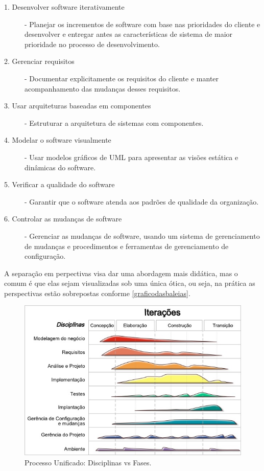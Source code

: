 \documentclass[
	article,			%
	11pt,				%
	oneside,			%
	a4paper,			%
	english,			%
	brazil,				%
	sumario=tradicional
	]{abntex2}
\begin{document}
\begin{description}
   \item[1. Desenvolver software iterativamente] - Planejar os incrementos de
   software com base nas prioridades do cliente e desenvolver e entregar antes
   as características de sistema de maior prioridade no processo de
   desenvolvimento.
   \item[2. Gerenciar requisitos] - Documentar explicitamente os requisitos do
   cliente e manter acompanhamento das mudanças desses requisitos.
   \item[3. Usar arquiteturas baseadas em componentes] - Estruturar a
   arquitetura de sistemas com componentes.
   \item[4. Modelar o software visualmente] - Usar modelos gráficos de UML para
   apresentar as visões estática e dinâmicas do software.
   \item[5. Verificar a qualidade do software] - Garantir que o software atenda
   aos padrões de qualidade da organização.
   \item[6. Controlar as mudanças de software] - Gerenciar as mudanças de
   software, usando um sistema de gerenciamento de mudanças e procedimentos e
   ferramentas de gerenciamento de configuração.
\end{description}

A separação em perpectivas visa dar uma abordagem mais didática, mas o comum é
que elas sejam visualizadas sob uma única ótica, ou seja, na prática as
perspectivas estão sobrepostas conforme \autoref{graficodasbaleias}.


\begin{figure}[htb]
   \caption{Processo Unificado: Disciplinas vs Fases.}
   \label{graficodasbaleias}
   \begin{center}
       \includegraphics[scale=0.8]{graficodasbaleias.jpg}
   \end{center}
\end{figure}
\end{document}
